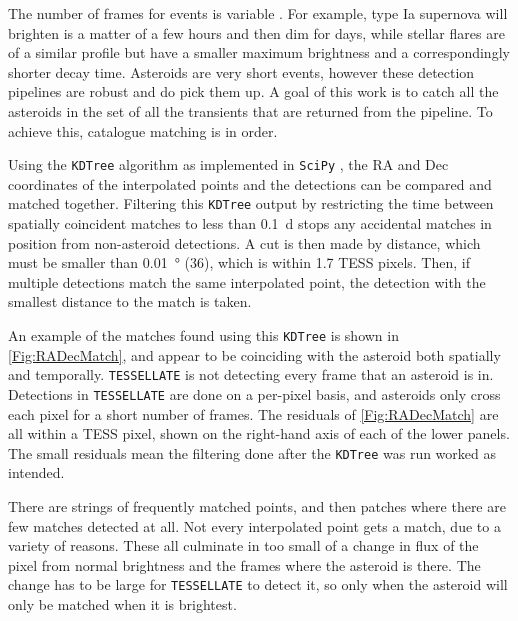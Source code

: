 \documentclass{UCreport}
\begin{document}
The number of frames for events is variable \citep{TESSELLATE}.
For example, type Ia supernova will brighten is a matter of a few hours and then dim for days, while stellar flares are of a similar profile but have a smaller maximum brightness and a correspondingly shorter decay time.
Asteroids are very short events, however these detection pipelines are robust and do pick them up.
A goal of this work is to catch all the asteroids in the set of all the transients that are returned from the pipeline.
To achieve this, catalogue matching is in order.

Using the \texttt{KDTree} algorithm \citep{Maneewongvatana1999} as implemented in \texttt{SciPy} \citep{2020SciPy-NMeth}, the RA and Dec coordinates of the interpolated points and the detections can be compared and matched together.
Filtering this \texttt{KDTree} output by restricting the time between spatially coincident matches to less than \qty{0.1}{\day} stops any accidental matches in position from non-asteroid detections.
A cut is then made by distance, which must be smaller than \qty{0.01}{\degree} (\qty{36}{\arcsec}), which is within 1.7 TESS pixels.
Then, if multiple detections match the same interpolated point, the detection with the smallest distance to the match is taken.

An example of the matches found using this \texttt{KDTree} is shown in \autoref{Fig:RADecMatch}, and appear to be coinciding with the asteroid both spatially and temporally.
\texttt{TESSELLATE} is not detecting every frame that an asteroid is in.
Detections in \texttt{TESSELLATE} are done on a per-pixel basis, and asteroids only cross each pixel for a short number of frames.
The residuals of \autoref{Fig:RADecMatch} are all within a TESS pixel, shown on the right-hand axis of each of the lower panels.
The small residuals mean the filtering done after the \texttt{KDTree} was run worked as intended.

There are strings of frequently matched points, and then patches where there are few matches detected at all.
Not every interpolated point gets a match, due to a variety of reasons.
These all culminate in too small of a change in flux of the pixel from normal brightness and the frames where the asteroid is there.
The change has to be large for \texttt{TESSELLATE} to detect it, so only when the asteroid will only be matched when it is brightest.
\end{document}
